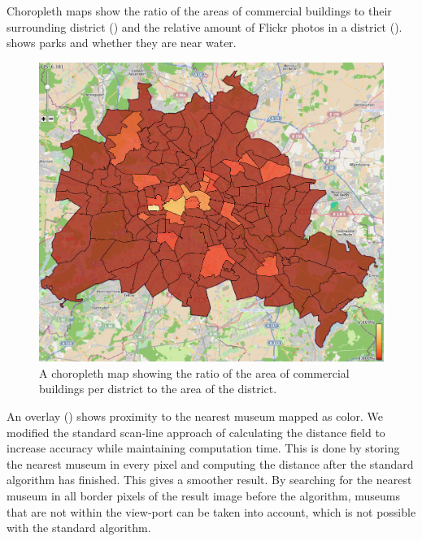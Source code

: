 Choropleth maps show the ratio of the areas of commercial buildings to their surrounding
district () and the relative amount of
Flickr photos in a district ().
 shows parks and whether they are near water.
\begin{figure}
        \centering
		\includegraphics[width=0.6\linewidth]{imgs/commercial}
        \caption{A choropleth map showing the ratio of the area of commercial buildings
        per district to the area of the district.}
		\label{fig:commercial}
\end{figure}
An overlay () shows proximity to the nearest museum mapped as color.
We modified the standard scan-line approach of calculating the distance field to
increase accuracy while maintaining computation time. This is done by storing
the nearest museum in every pixel and computing the distance after the standard
algorithm has finished. This gives a smoother result. By searching for the nearest
museum in all border pixels of the result image before the algorithm, museums that
are not within the view-port can be taken into account, which is not possible with
the standard algorithm.

